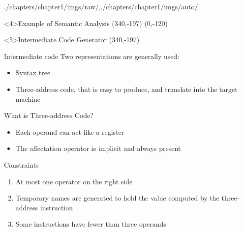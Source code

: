 \begin{graphicspathcontext}{{./chapters/chapter1/imgs/raw/},{./chapters/chapter1/imgs/auto/}}
\begin{bibunit}[apalike]
\begin{frame}<4>{Example of Semantic Analysis}
	\putat*(340,-197){}
	\putat(0,-120){}
\end{frame}

\begin{frame}<5>{{Intermediate Code} Generator}
	\putat*(340,-197){}
	\begin{minipage}{.8\linewidth}
		\vspace{1cm}
		\begin{block}{Intermediate code}
			Two representations are generally used: \begin{itemize}
				\item Syntax tree
				\item Three-address code, that is easy to produce, and translate into the target machine
			\end{itemize}
		\end{block}
	\end{minipage}
\end{frame}

\begin{frame}{{What is} Three-address Code?}
	\begin{itemize}
	\item Each operand can act like a register
	\item The affectation operator is implicit and always present
	\end{itemize}
	\begin{alertblock}{Constraints}
		\begin{enumerate}
			\item At most one operator on the right side
			\item Temporary names are generated to hold the value computed by the three-address instruction
			\item Some instructions have fewer than three operands
		\end{enumerate}
	\end{alertblock}
\end{frame}


\end{bibunit}
\end{graphicspathcontext}
